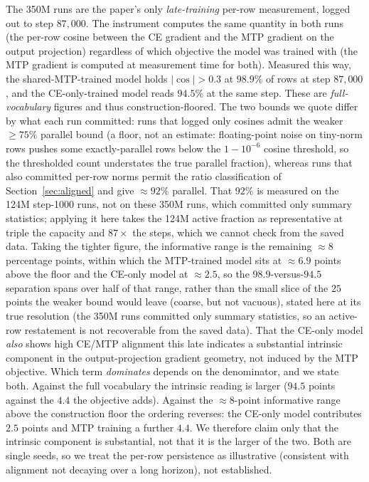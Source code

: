 The 350M runs are the paper's only \emph{late-training} per-row measurement,
logged out to step $87{,}000$. The instrument computes the same quantity in both
runs (the per-row cosine between the CE gradient and the MTP gradient on the output projection) regardless of which objective the model was trained with
(the MTP gradient is computed at measurement time for both). Measured this way,
the shared-MTP-trained model holds $|\cos|>0.3$ at $98.9\%$ of rows at step
$87{,}000$, and the CE-only-trained model reads $94.5\%$ at the same step. These
are \emph{full-vocabulary} figures and thus construction-floored. The two bounds we
quote differ by what each run committed: runs that logged only cosines admit the
weaker ${\geq}75\%$ parallel bound (a floor, not an estimate: floating-point
noise on tiny-norm rows pushes some exactly-parallel rows below the
$1-10^{-6}$ cosine threshold, so the thresholded count understates the true
parallel fraction), whereas runs that also committed per-row norms
permit the ratio classification of Section~\ref{sec:aligned} and give
${\approx}92\%$ parallel. That $92\%$ is measured on the 124M step-1000 runs, not on
these 350M runs, which committed only summary statistics; applying it here takes the
124M active fraction as representative at triple the capacity and $87\times$ the
steps, which we cannot check from the saved data. Taking the tighter figure, the informative range is
the remaining ${\approx}8$ percentage points, within which the MTP-trained model sits
at ${\approx}6.9$ points above the floor and the CE-only model at ${\approx}2.5$, so
the $98.9$-versus-$94.5$ separation spans over half of that range, rather than the
small slice of the $25$ points the weaker bound would leave (coarse, but not
vacuous),
stated here at its true resolution (the 350M runs committed only summary statistics,
so an active-row restatement is not recoverable from the saved data). That
the CE-only model \emph{also} shows high CE/MTP alignment this late indicates a
substantial intrinsic component in the output-projection gradient geometry, not
induced by the MTP objective. Which term \emph{dominates} depends on the
denominator, and we state both. Against the full vocabulary the intrinsic reading is
larger ($94.5$ points against the $4.4$ the objective adds). Against the
${\approx}8$-point informative range above the construction floor the ordering
reverses: the CE-only model contributes $2.5$ points and MTP training a further
$4.4$. We therefore claim only that the intrinsic component is substantial, not that
it is the larger of the two. Both are single seeds, so we treat the
per-row persistence as illustrative (consistent with alignment not decaying over a
long horizon), not established.

